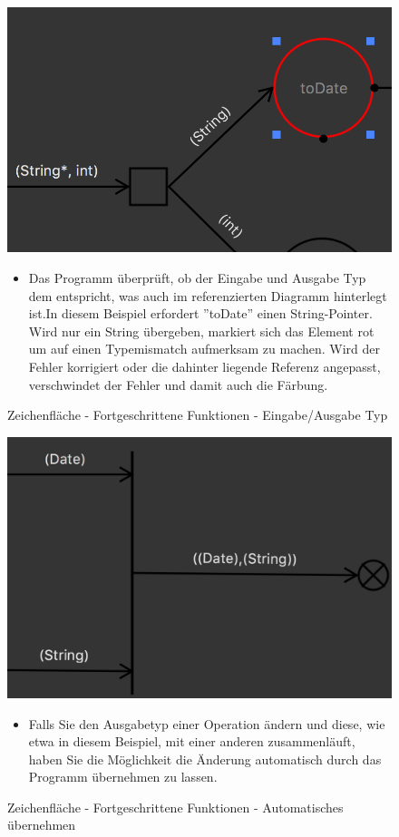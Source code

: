 \begin{figure}[h!]
	\centering
	\includegraphics[width=.6\textwidth]{Advanced3.png}
	\caption{Zeichenfläche - Fortgeschrittene Funktionen - Eingabe/Ausgabe Typ}
\begin{itemize}	
\item Das Programm überprüft, ob der Eingabe und Ausgabe Typ dem entspricht, was auch im referenzierten Diagramm hinterlegt ist.In diesem Beispiel erfordert ''toDate'' einen String-Pointer. Wird nur ein String übergeben, markiert sich das Element rot um auf einen Typemismatch aufmerksam zu machen. Wird der Fehler korrigiert oder die dahinter liegende Referenz angepasst, verschwindet der Fehler und damit auch die Färbung.
\end{itemize}
\end{figure}

\begin{figure}[h!]
	\centering
	\includegraphics[width=.6\textwidth]{Quelle.png}
	\caption{Zeichenfläche - Fortgeschrittene Funktionen - Automatisches übernehmen}
\begin{itemize}	
\item Falls Sie den Ausgabetyp einer Operation ändern und diese, wie etwa in diesem Beispiel, mit einer anderen zusammenläuft, haben Sie die Möglichkeit die Änderung automatisch durch das Programm übernehmen zu lassen. 
\end{itemize}
\end{figure}


